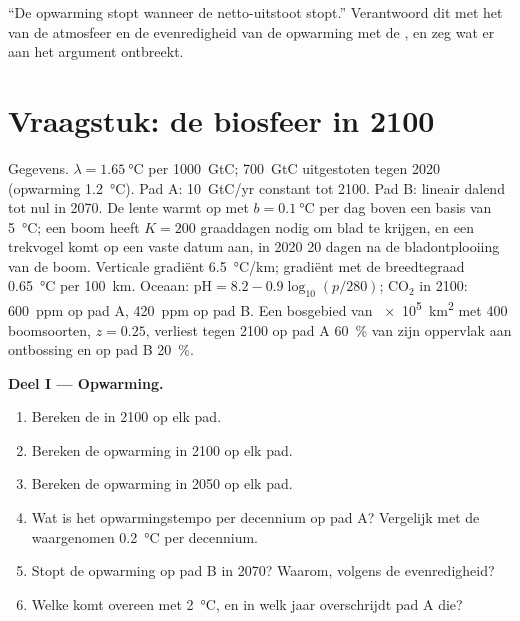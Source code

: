 \begin{exercise}[$\star\star\star$]\label{exo:b2:global-change:12}
``De opwarming stopt wanneer de netto-uitstoot stopt.'' Verantwoord dit met het
 van de atmosfeer en de evenredigheid van de opwarming met de
, en zeg wat er aan het argument ontbreekt.
\end{exercise}

\section{Vraagstuk: de biosfeer in 2100}

\begin{problem}
\label{pb:b2:global-change:1}
Gegevens. $\lambda = \qty{1.65}{\celsius}$ per \qty{1000}{GtC};
\qty{700}{GtC} uitgestoten tegen 2020 (opwarming \qty{1.2}{\celsius}). Pad
A: \qty{10}{GtC/yr} constant tot 2100. Pad B: lineair dalend tot
nul in 2070. De lente warmt op met $b = \qty{0.1}{\celsius}$ per dag
boven een basis van \qty{5}{\celsius}; een boom heeft $K = 200$
graaddagen nodig om blad te krijgen, en een trekvogel komt op een vaste datum
aan, in 2020 20 dagen na de bladontplooiing van de boom. Verticale gradiënt
\qty{6.5}{\celsius/km}; gradiënt met de breedtegraad \qty{0.65}{\celsius}
per \qty{100}{km}. Oceaan: $\mathrm{pH} = 8.2 - 0.9\log_{10}(p/280)$;
\ensuremath{\mathrm{CO_2}} in 2100: \qty{600}{ppm} op pad A, \qty{420}{ppm} op pad B.
Een bosgebied van \qty{e5}{km^2} met 400 boomsoorten, $z = 0.25$,
verliest tegen 2100 op pad A \qty{60}{\%} van zijn oppervlak aan ontbossing en
op pad B \qty{20}{\%}.

\medskip
\noindent\textbf{Deel I --- Opwarming.}
\begin{enumerate}
  \item Bereken de  in 2100 op elk pad.
  \item Bereken de opwarming in 2100 op elk pad.
  \item Bereken de opwarming in 2050 op elk pad.
  \item Wat is het opwarmingstempo per decennium op pad A? Vergelijk met
        de waargenomen \qty{0.2}{\celsius} per decennium.
  \item Stopt de opwarming op pad B in 2070? Waarom, volgens de
        evenredigheid?
  \item Welke  komt overeen met \qty{2}{\celsius},
        en in welk jaar overschrijdt pad A die?
\end{enumerate}


\end{problem}
